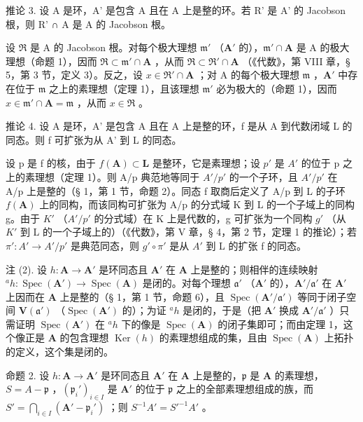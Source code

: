 推论 3. 设 A 是环，A' 是包含 A 且在 A 上是整的环。若 R' 是 A' 的 Jacobson 根，则 R' ∩ A 是 A 的 Jacobson 根。

设 \(\mathfrak{R}\) 是 A 的 Jacobson 根。对每个极大理想 \(\mathfrak{m}'\) （\(\mathbf{A}'\) 的），\(\mathfrak{m}' \cap \mathbf{A}\) 是 A 的极大理想（命题 1），因而 \(\mathfrak{R} \subset \mathfrak{m}' \cap \mathbf{A}\) ，从而 \(\mathfrak{R} \subset \mathfrak{R}' \cap \mathbf{A}\) （《代数》，第 VIII 章，§ 5，第 3 节，定义 3）。反之，设 \(x \in \mathfrak{R}' \cap \mathbf{A}\) ；对 A 的每个极大理想 \(\mathfrak{m}\) ，\(\mathbf{A}'\) 中存在位于 \(\mathfrak{m}\) 之上的素理想（定理 1），且该理想 \(\mathfrak{m}'\) 必为极大的（命题 1），因而 \(x \in \mathfrak{m}' \cap \mathbf{A} = \mathfrak{m}\) ，从而 \(x \in \mathfrak{R}\) 。

推论 4. 设 A 是环，A' 是包含 A 且在 A 上是整的环，f 是从 A 到代数闭域 L 的同态。则 f 可扩张为从 A' 到 L 的同态。

设 p 是 f 的核，由于 \(f(\mathbf{A}) \subset \mathbf{L}\) 是整环，它是素理想；设 \(p'\) 是 \(A'\) 的位于 p 之上的素理想（定理 1）。则 A/p 典范地等同于 \(A'/p'\) 的一个子环，且 \(A'/p'\) 在 A/p 上是整的（§ 1，第 1 节，命题 2）。同态 f 取商后定义了 A/p 到 L 的子环 \(f(\mathbf{A})\) 上的同构，而该同构可扩张为 A/p 的分式域 K 到 L 的一个子域上的同构 g。由于 \(K'\) （\(A'/p'\) 的分式域）在 K 上是代数的，g 可扩张为一个同构 \(g'\) （从 \(K'\) 到 L 的一个子域上的）（《代数》，第 V 章，§ 4，第 2 节，定理 1 的推论）；若 \(\pi': A' \to A'/p'\) 是典范同态，则 \(g' \circ \pi'\) 是从 \(A'\) 到 L 的扩张 f 的同态。

注 (2). 设 \(h \colon \mathbf{A} \to \mathbf{A}'\) 是环同态且 \(\mathbf{A}'\) 在 \(\mathbf{A}\) 上是整的；则相伴的连续映射 \(^a h \colon \operatorname{Spec}(\mathbf{A}') \to \operatorname{Spec}(\mathbf{A})\) 是闭的。对每个理想 \(\mathfrak{a}'\) （\(\mathbf{A}'\) 的），\(\mathbf{A}' / \mathfrak{a}'\) 在 \(\mathbf{A}'\) 上因而在 \(\mathbf{A}\) 上是整的（§ 1，第 1 节，命题 6），且 \(\operatorname{Spec}(\mathbf{A}' / \mathfrak{a}')\) 等同于闭子空间 \(\mathbf{V}(\mathfrak{a}')\) （\(\operatorname{Spec}(\mathbf{A}')\) 的）；为证 \(^a h\) 是闭的，于是（把 \(\mathbf{A}'\) 换成 \(\mathbf{A}' / \mathfrak{a}'\) ）只需证明 \(\operatorname{Spec}(\mathbf{A}')\) 在 \(^a h\) 下的像是 \(\operatorname{Spec}(\mathbf{A})\) 的闭子集即可；而由定理 1，这个像正是 \(\mathbf{A}\) 的包含理想 \(\operatorname{Ker}(h)\) 的素理想组成的集，且由 \(\operatorname{Spec}(\mathbf{A})\) 上拓扑的定义，这个集是闭的。

命题 2. 设 \(h: \mathbf{A} \to \mathbf{A}'\) 是环同态且 \(\mathbf{A}'\) 在 \(\mathbf{A}\) 上是整的，\(\mathfrak{p}\) 是 \(\mathbf{A}\) 的素理想，\(S = A - \mathfrak{p}\) ，\((\mathfrak{p}_i')_{i \in I}\) 是 \(\mathbf{A}'\) 的位于 \(\mathfrak{p}\) 之上的全部素理想组成的族，而 \(S' = \bigcap_{i \in I} (\mathbf{A}' - \mathfrak{p}_i')\) ；则 \(S^{-1}A' = S'^{-1}A'\) 。

